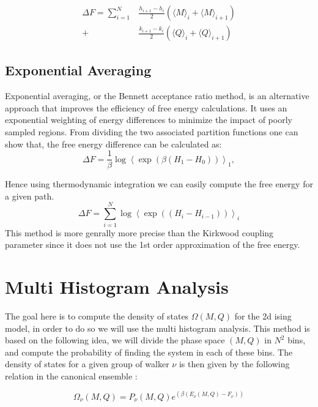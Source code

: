\documentclass[ansiapaper]{report}
\begin{document}
\begin{multicols}{3}
\begin{equation}
    \begin{split}
        \Delta F = \sum_{i=1}^{N} &\frac{h_{i+1} - h_i}{2} (\langle M \rangle_i + \langle M \rangle_{i+1}) \\
                                  + &\frac{k_{i+1}- k_i}{2} (\langle Q \rangle_i + \langle Q \rangle_{i+1})
    \end{split}
    \label{eq:Thermodynamic_integration}
\end{equation}
\subsection{Exponential Averaging}  
Exponential averaging, or the Bennett acceptance ratio method, is an alternative approach that improves the efficiency of free energy calculations. It uses an exponential weighting of energy differences to minimize the impact of poorly sampled regions. From dividing the two associated partition functions one can show that, the free energy difference can be calculated as:
\[
\Delta F = \frac{1}{\beta} \log \left\langle \exp\left(\beta (H_1 - H_0)\right) \right\rangle_{1},
\]

Hence using thermodynamic integration we can easily compute the free energy for a given path. 
\begin{equation}
        \Delta F = \sum_{i=1}^{N} \log \left\langle \exp\left((H_{i} - H_{i-1})\right) \right\rangle_{i}  
    \label{eq:Thermodynamic_integration}
\end{equation}
This method is more genrally more precise than the Kirkwood coupling parameter since it does not use the 1st order approximation of the free energy. 

\section{Multi Histogram Analysis}
The goal here is to compute the density of states $\Omega(M,Q)$ for the 2d ising model, in order to do so we will use the multi histogram analysis. This method is based on the following idea, we will divide the phase space \textbf{$(M, Q) $} in $N^2$ bins, and compute the probability of finding the system in each of these bins. The density of states for a given group of walker $\nu$ is then given by the following relation in the canonical ensemble : 

\begin{equation}
    \Omega_{\nu}(M,Q)= P_{\nu}(M,Q)e^{(\beta (E_{\nu}(M,Q) - F_{\nu}))}
    \label{eq:density of states}
\end{equation}


\end{multicols}
\end{document}
